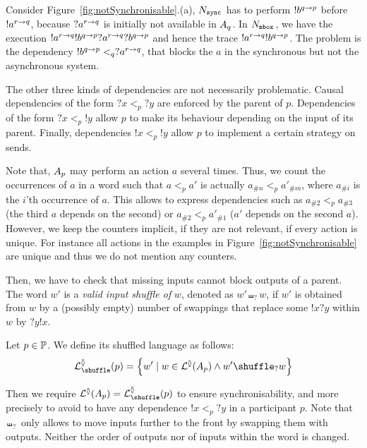 \documentclass[submission,copyright,creativecommons,UKenglish]{eptcs}
\begin{document}
\begin{example}
	Consider Figure~\ref{fig:notSynchronisable}.(a), $ N_{{\mathtt{sync}}^{}} $  has to perform $ !b^{q \rightarrow p} $ before $ !a^{r \rightarrow q} $, because $ ?a^{r \rightarrow q} $ is initially not available in $ A_{q} $.
	In $ N_{{\mathtt{mbox}}^{}} $, we have the execution $ !a^{r \rightarrow q} !b^{q \rightarrow p} ?a^{r \rightarrow q} ?b^{q \rightarrow p} $ and hence the trace $ !a^{r \rightarrow q} !b^{q \rightarrow p} $.
	The problem is the dependency $ !b^{q \rightarrow p} <_q ?a^{r \rightarrow q} $, that blocks the $ a $ in the synchronous but not the asynchronous system.
\end{example}

The other three kinds of dependencies are not necessarily problematic.
Causal dependencies of the form $ ?x <_p ?y $ are enforced by the parent of $ p $.
Dependencies of the form $ ?x <_p !y $ allow $ p $ to make its behaviour depending on the input of its parent.
Finally, dependencies $ !x <_p !y $ allow $ p $ to implement a certain strategy on sends.

Note that, $ A_{p} $ may perform an action $ a $ several times.
Thus, we count the occurrences of $ a $ in a word such that $ a <_p a' $ is actually $ a_{\# n} <_p a'_{\# m} $, where $ a_{\# i} $ is the $ i $'th occurrence of $ a $.
This allows to express dependencies such as $ a_{\# 2} <_p a_{\# 3} $ (the third $ a $ depends on the second) or $ a_{\# 2} <_p a'_{\# 1} $ ($ a' $ depends on the second $ a $).
However, we keep the counters implicit, if they are not relevant, \ie if every action is unique.
For instance all actions in the examples in Figure~\ref{fig:notSynchronisable} are unique and thus we do not mention any counters.

Then, we have to check that missing inputs cannot block outputs of a parent.
The word  $ w' $ is a \emph{valid input shuffle of} $ w $, denoted as $ w' \shuffle_{?} w $, if $ w' $ is obtained from $ w $ by a (possibly empty) number of swappings that replace some $ !x?y $ within $ w $ by $ ?y!x $.

\begin{definition}
	Let $ p \in \mathbb{P} $.
	We define its shuffled language as follows:
	$$ \LangShuffle{p} = \Set{w' \mid w \in \LangTree{\Automaton{p}} \wedge w' \shuffle_{?} w} $$ 
\end{definition}

Then we require $ \LangTree{\Automaton{p}} = \LangShuffle{p} $ to ensure synchronisability, and more precisely to avoid to have any dependence $ !x <_p ?y $ in a participant $ p $.
Note that $ \shuffle_? $ only allows to move inputs further to the front by swapping them with outputs.
Neither the order of outputs nor of inputs within the word is changed.
\end{document}
